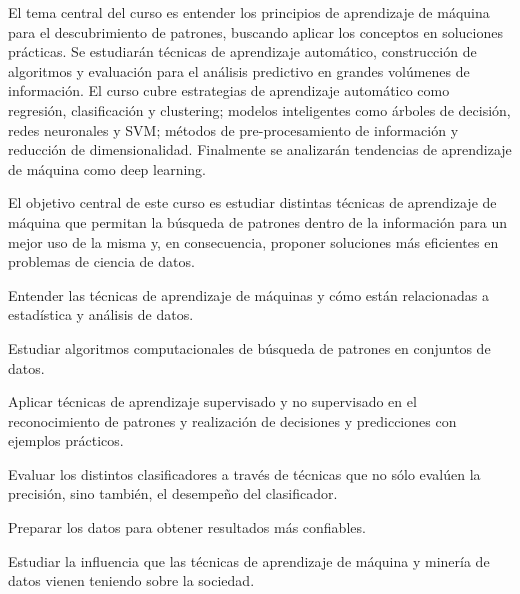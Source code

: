 \begin{syllabus}


\begin{justification}

El tema central del curso es entender los principios de aprendizaje de máquina para el descubrimiento de patrones, buscando aplicar los conceptos en soluciones prácticas. Se estudiarán técnicas de aprendizaje automático, construcción de algoritmos y evaluación para el análisis predictivo en grandes volúmenes de información. El curso cubre estrategias de aprendizaje automático como regresión, clasificación y clustering; modelos inteligentes como árboles de decisión, redes neuronales y SVM; métodos de pre-procesamiento de información y reducción de dimensionalidad. Finalmente se analizarán tendencias de aprendizaje de máquina como deep learning.
\end{justification}

\begin{goals}
\item El objetivo central de este curso es estudiar distintas técnicas de aprendizaje de máquina que permitan la búsqueda de patrones 
      dentro de la información para un mejor uso de la misma y, en consecuencia, proponer soluciones más eficientes en problemas de ciencia de datos.
\item Entender las técnicas de aprendizaje de máquinas y cómo están relacionadas a estadística y análisis de datos.
\item Estudiar algoritmos computacionales de búsqueda de patrones en conjuntos de datos.
\item Aplicar técnicas de aprendizaje supervisado y no supervisado en el reconocimiento de patrones y realización de decisiones y predicciones con ejemplos prácticos.
\item Evaluar los distintos clasificadores a través de técnicas que no sólo evalúen la precisión, sino también, el desempeño del clasificador.
\item Preparar los datos para obtener resultados más confiables.
\item Estudiar la influencia que las técnicas de aprendizaje de máquina y minería de datos vienen teniendo sobre la sociedad.
\end{goals}

\begin{outcomes}
\item {}
\item {}
\end{outcomes}


\end{syllabus}
